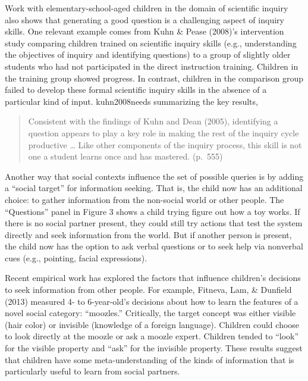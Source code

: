\documentclass[oneside]{report}
\begin{document}
Work with elementary-school-aged children in the domain of scientific
inquiry also shows that generating a good question is a challenging
aspect of inquiry skills. One relevant example comes from Kuhn \& Pease
(2008)'s intervention study comparing children trained on scientific
inquiry skills (e.g., understanding the objectives of inquiry and
identifying questions) to a group of slightly older students who had not
participated in the direct instruction training. Children in the
training group showed progress. In contrast, children in the comparison
group failed to develop these formal scientific inquiry skills in the
absence of a particular kind of input. kuhn2008needs summarizing the key
results,
\begin{quote}
Consistent with the findings of Kuhn and Dean (2005), identifying a
question appears to play a key role in making the rest of the inquiry
cycle productive \ldots{} Like other components of the inquiry process,
this skill is not one a student learns once and has mastered. (p.~555)
\end{quote}
Another way that social contexts influence the set of possible queries
is by adding a ``social target'' for information seeking. That is, the
child now has an additional choice: to gather information from the
non-social world or other people. The ``Questions'' panel in Figure 3
shows a child trying figure out how a toy works. If there is no social
partner present, they could still try actions that test the system
directly and seek information from the world. But if another person is
present, the child now has the option to ask verbal questions or to seek
help via nonverbal cues (e.g., pointing, facial expressions).

Recent empirical work has explored the factors that influence children's
decisions to seek information from other people. For example, Fitneva,
Lam, \& Dunfield (2013) measured 4- to 6-year-old's decisions about how
to learn the features of a novel social category: ``moozles.''
Critically, the target concept was either visible (hair color) or
invisible (knowledge of a foreign language). Children could choose to
look directly at the moozle or ask a moozle expert. Children tended to
``look'' for the visible property and ``ask'' for the invisible
property. These results suggest that children have some
meta-understanding of the kinds of information that is particularly
useful to learn from social partners.
\end{document}
